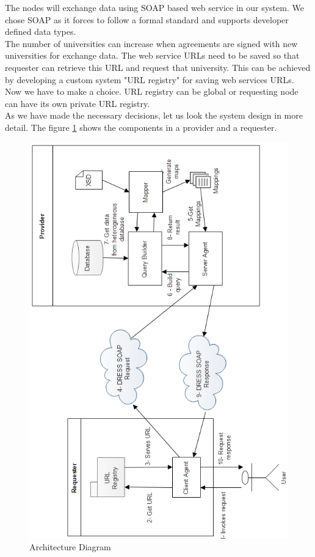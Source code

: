 \documentclass[12pt,a4paper,oneside]{book}
\begin{document}
The nodes will exchange data using SOAP based web service in our system.  We chose SOAP as it forces to follow a formal standard and supports developer defined data types. \\

The number of universities can increase when agreements are signed with new universities for exchange data. The web service URLs need to be saved so that requester can retrieve this URL and request that university. This can be achieved by developing a custom system "URL registry" for saving web services URLs. Now we have to make a choice. URL registry can be global or requesting node can have its own private URL registry. \\

As we have made the necessary decisions, let us look the system design in more detail. The figure \ref{fig:architecture} shows the components in a provider and a requester. \\

\begin{figure}[!htp]
  \centering
  \includegraphics[width=14cm]{architecture.png}
  \caption{Architecture Diagram}
  \label{fig:architecture}
\end{figure}
\end{document}

